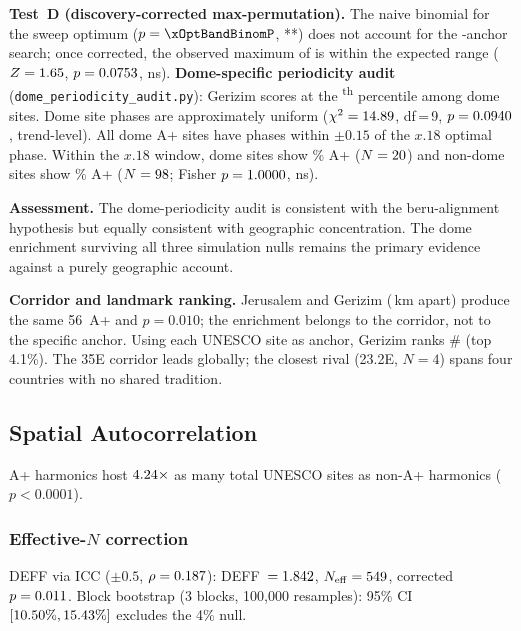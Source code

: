\documentclass[12pt,a4paper]{article}
\begin{document}
\textbf{Test~D (discovery-corrected max-permutation).}
\label{sec:x18_optband}
The naive binomial for the sweep optimum ($p = \xOptBandBinomP$, **) does not
account for the \anchorSweepNanchors{}-anchor search; once corrected,
the observed maximum of \anchorMaxPermObsMax{} is within the expected range
($Z=1.65$, $p=0.0753$, ns).
\label{sec:dome_periodicity}
\textbf{Dome-specific periodicity audit}
(\texttt{dome\_periodicity\_audit.py}):
Gerizim scores at the \domeGerizimPctile\textsuperscript{th} percentile
among dome sites. Dome site phases are approximately uniform
($\chi^2 = 14.89$, df\,=\,9, $p = 0.0940$, trend-level).
All \NcircTierAp{} dome A+ sites have phases within $\pm 0.15$\textdegree{}
of the $x.18$\textdegree{} optimal phase. Within the $x.18$\textdegree{}
window, dome sites show \domeBandRate\%{} A+ ($N = 20$) and
non-dome sites show \nonDomeBandRate\%{} A+ ($N = 98$; Fisher
$p = 1.0000$, ns).

\textbf{Assessment.}
The dome-periodicity audit is consistent with the beru-alignment hypothesis
but equally consistent with geographic concentration. The dome enrichment
surviving all three simulation nulls remains the primary evidence against
a purely geographic account.

\textbf{Corridor and landmark ranking.}
Jerusalem and Gerizim (\GerizimJerusalemKm\,km apart) produce the same
56~A+ and $p = 0.010$; the enrichment belongs to the corridor, not to
the specific anchor. Using each UNESCO site as anchor, Gerizim ranks
\#\GerizimTempleRank{} (top 4.1\%). The 35\textdegree{}E corridor leads
globally; the closest rival (23.2\textdegree{}E, $N=4$) spans four
countries with no shared tradition.

\subsection{Spatial Autocorrelation}
\label{sec:autocorrelation}

A+ harmonics host $4.24\times$ as many total UNESCO
sites as non-A+ harmonics ($p < 0.0001$).

\subsubsection*{Effective-$N$ correction}

DEFF via ICC ($\pm 0.5$\textdegree{}, $\rho = 0.187$):
DEFF~$= 1.842$, $N_\mathrm{eff} = 549$,
corrected $p = 0.011$.
Block bootstrap (3\textdegree{} blocks, 100{,}000 resamples):
95\% CI $[10.50\%, 15.43\%]$ excludes the 4\% null.
\end{document}
